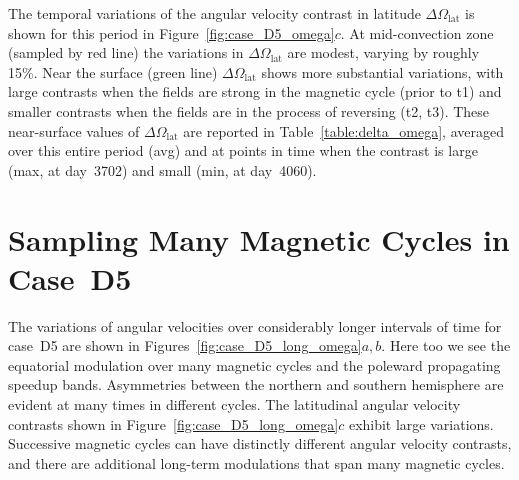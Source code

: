 \clearpage
The temporal variations of the angular velocity contrast in latitude
$\Delta \Omega_\mathrm{lat}$ is shown for this period in
Figure~\ref{fig:case_D5_omega}$c$.  At mid-convection zone (sampled by
red line) the variations in $\Delta \Omega_\mathrm{lat}$ are
modest, varying by roughly 15\%. 
Near the surface (green line) $\Delta \Omega_\mathrm{lat}$ shows more
substantial variations, with large contrasts when the fields are
strong in the magnetic cycle (prior to t1) and smaller contrasts when the
fields are in the process of reversing (t2, t3).  These near-surface
values of $\Delta \Omega_\mathrm{lat}$ are reported in
Table~\ref{table:delta_omega}, averaged over this entire period
(avg) and at points in time when the contrast is large (max,
at day~3702) and small (min, at day~4060).





\section{Sampling Many Magnetic Cycles in Case~D5}
\label{sec:long_time_D5}


The variations of angular velocities over considerably longer intervals of
time for case~D5 are shown in Figures~\ref{fig:case_D5_long_omega}$a,b$.  
Here too we see the equatorial modulation over many magnetic cycles and the
poleward propagating speedup bands.  Asymmetries between the northern
and southern hemisphere are evident at many times in different
cycles.  The latitudinal angular velocity contrasts shown in
Figure~\ref{fig:case_D5_long_omega}$c$ exhibit large variations.
Successive magnetic cycles can have distinctly different angular
velocity contrasts, and there are additional long-term modulations
that span many magnetic cycles.




